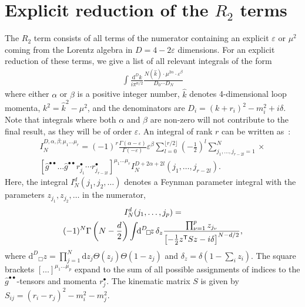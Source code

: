 \documentclass[11pt,a4paper]{refrep}
\newcommand{\diff}[1][{}]{{\mathrm{d}}^{#1}\!}
\begin{document}
\chapter{Explicit reduction of the $R_2$ terms}
The $R_2$ term \cite{Ossola:2008xq} consists of all terms of the numerator
containing an explicit $\varepsilon$ or $\mu^2$ coming from the Lorentz
algebra in $D=4-2\varepsilon$ dimensions. 
For an explicit reduction of these terms, we give a list of all relevant integrals of the form
\begin{align}
\int\frac{\diff[D] k}{i\pi^{n/2}}
\frac{N(\hat{k})\cdot\mu^{2\alpha}\cdot\varepsilon^\beta}{D_0\cdots D_N}
\end{align}
where either $\alpha$ or $\beta$ is a positive integer number, 
$\hat{k}$ denotes 4-dimensional loop momenta, $k^2=\hat{k}^2-\mu^2$, 
and the denominators are $D_i=(k+r_i)^2-m_i^2+i\delta$.
Note that integrals where both $\alpha$ and $\beta$ are
non-zero will not contribute to the final result, as they will be of order $\varepsilon$.
An integral of rank $r$ 
can be written as~\cite{Binoth:2005ff,Reiter:2009kb}:
\begin{multline}
I_N^{D,\alpha,\beta;\mu_1\ldots\mu_r}=
(-1)^{r}\frac{\Gamma(\alpha-\varepsilon)}{\Gamma(-\varepsilon)}
\varepsilon^\beta
\sum_{l=0}^{\lfloor r/2\rfloor}\left(-\frac12\right)^l
\sum_{j_1,\ldots,j_{r-2l}=1}^N
\times\\
\left[\hat{g}^{\bullet\bullet}\ldots
\hat{g}^{\bullet\bullet}r_{j_1}^\bullet
\cdots r_{j_{r-2l}}^\bullet\right]^{\mu_1\ldots\mu_r}
I_N^{D+2\alpha+2l}(j_1,\ldots,j_{r-2l}).
\end{multline}
Here, the integral $I_N^d(j_1,j_2,\ldots)$ denotes a Feynman parameter
integral with the parameters $z_{j_1}, z_{j_2}, \ldots$ in the numerator,
\begin{multline}
I_N^d(j_1,\ldots, j_p)=\\
(-1)^N\Gamma\left(N-\frac{d}2\right)%
\int\!\!\diff[D]_\Box\!z\,\delta_z
\frac{\prod_{\nu=1}^p z_{j_\nu}}{%
\left[-\frac12 z^{\mathsf{T}}Sz-i\delta\right]^{N-d/2}},
\end{multline}
where $\diff[D]_\Box\!z=
\prod_{j=1}^N\mathrm{d}z_j\Theta(z_j)\Theta(1-z_j)$
and $\delta_z=\delta(1-\sum_i z_i)$.
The square brackets $[\ldots]^{\mu_1\ldots\mu_p}$ expand to the sum of
all possible assignments of indices to the $\hat{g}^{\bullet\bullet}$-tensors
and momenta $r_j^\bullet$. 
The kinematic matrix $S$ is given by $S_{ij}=(r_i-r_j)^2-m_i^2-m_j^2$.
\end{document}
